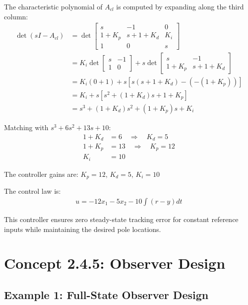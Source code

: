 \documentclass[11pt,a4paper]{article}
\begin{document}
The characteristic polynomial of $A_{cl}$ is computed by expanding along the third column:
\begin{align}
\det(sI - A_{cl}) &= \det\begin{bmatrix} s & -1 & 0 \\ 1+K_p & s+1+K_d & K_i \\ 1 & 0 & s \end{bmatrix} \\
&= K_i \det\begin{bmatrix} s & -1 \\ 1 & 0 \end{bmatrix} + s\det\begin{bmatrix} s & -1 \\ 1+K_p & s+1+K_d \end{bmatrix} \\
&= K_i(0 + 1) + s[s(s+1+K_d) - (-(1+K_p))] \\
&= K_i + s[s^2 + (1+K_d)s + 1 + K_p] \\
&= s^3 + (1+K_d)s^2 + (1+K_p)s + K_i
\end{align}

Matching with $s^3 + 6s^2 + 13s + 10$:
\begin{align}
1 + K_d &= 6 \quad \Rightarrow \quad K_d = 5 \\
1 + K_p &= 13 \quad \Rightarrow \quad K_p = 12 \\
K_i &= 10
\end{align}

The controller gains are: $K_p = 12$, $K_d = 5$, $K_i = 10$

The control law is:
\begin{align}
u = -12x_1 - 5x_2 - 10\int(r-y)dt
\end{align}

This controller ensures zero steady-state tracking error for constant reference inputs while maintaining the desired pole locations.

\section{Concept 2.4.5: Observer Design}

\subsection{Example 1: Full-State Observer Design}
\end{document}
